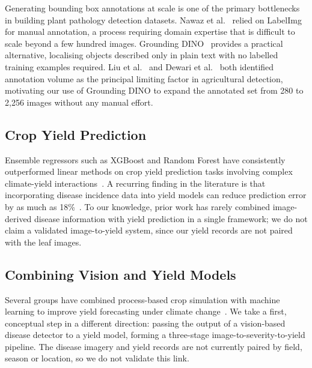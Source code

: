 Generating bounding box annotations at scale is one of the primary
bottlenecks in building plant pathology detection datasets.
Nawaz et al.~\cite{nawaz2023} relied on LabelImg for manual
annotation, a process requiring domain expertise that is difficult to
scale beyond a few hundred images.
Grounding DINO~\cite{groundingdino} provides a practical alternative,
localising objects described only in plain text with no labelled
training examples required.
Liu et al.~\cite{liu2019pestnet} and Dewari et
al.~\cite{dewari2022} both identified annotation volume as the
principal limiting factor in agricultural detection, motivating our
use of Grounding DINO to expand the annotated set from 280 to 2,256
images without any manual effort.

\subsection{Crop Yield Prediction}

Ensemble regressors such as XGBoost and Random Forest have
consistently outperformed linear methods on crop yield prediction
tasks involving complex climate-yield
interactions~\cite{ml_yield_review}.
A recurring finding in the literature is that incorporating disease
incidence data into yield models can reduce prediction error by as
much as 18\%~\cite{disease_yield_integration}.
To our knowledge, prior work has rarely combined image-derived disease
information with yield prediction in a single framework; we do not claim a
validated image-to-yield system, since our yield records are not paired
with the leaf images.

\subsection{Combining Vision and Yield Models}
\label{sec:integrated}

Several groups have combined process-based crop simulation with
machine learning to improve yield forecasting under climate
change~\cite{hybrid_yield}.
We take a first, conceptual step in a different direction: passing the
output of a vision-based disease detector to a yield model, forming a
three-stage image-to-severity-to-yield pipeline. The disease imagery and
yield records are not currently paired by field, season or location, so
we do not validate this link.
